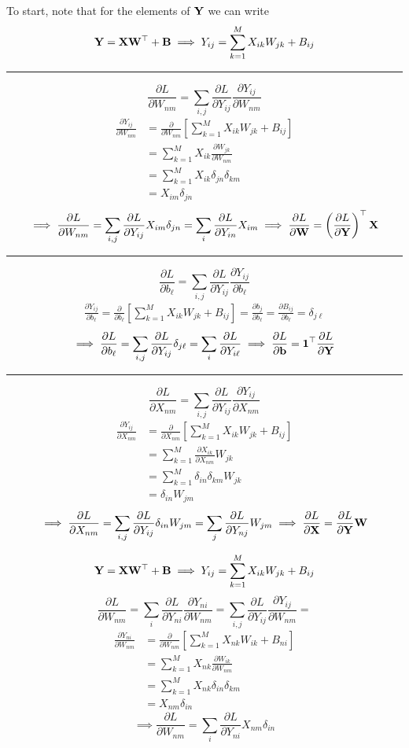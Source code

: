 \documentclass[a4paper]{article}
\newcommand{\1}{\mathbbm{1}}
\renewcommand{\l}{\left}
\renewcommand{\r}{\right}
\newcommand{\<}{\langle}
\renewcommand{\>}{\rangle}
\newcommand{\p}[1]{\frac{\partial}{\partial #1}}
\newcommand{\pp}[2]{\frac{\partial #1}{\partial #2}}
\newcommand{\bs}{\boldsymbol}
\begin{document}
\begin{ans}[Solution]
To start, note that for the elements of $\bold Y$ we can write
$$\bold Y = \bold X \bold W^\top + \bold B \implies Y_{ij} = \sum_{k=1}^M X_{ik} W_{jk} + B_{ij}$$
\hrule
$$\pp{L}{W_{nm}} = \sum_{i,j} \pp{L}{Y_{ij}} \pp{Y_{ij}}{W_{nm}}$$
\begin{align*}
\pp{Y_{ij}}{W_{nm}} &= \p{W_{nm}} \l[ \sum_{k=1}^M X_{ik} W_{jk} + B_{ij} \r] \\
&= \sum_{k=1}^M X_{ik} \pp{W_{jk}}{W_{nm}} \\
&= \sum_{k=1}^M X_{ik} \delta_{jn} \delta_{km} \\
&= X_{im} \delta_{jn}
\end{align*}
$$\implies \pp{L}{W_{nm}} = \sum_{i,j} \pp{L}{Y_{ij}} X_{im} \delta_{jn} = \sum_i \pp{L}{Y_{in}} X_{im} \implies \pp{L}{\bold W} = \l( \pp{L}{\bold Y} \r)^\top \bold X$$
\hrule
$$\pp{L}{b_\ell} = \sum_{i,j} \pp{L}{Y_{ij}} \pp{Y_{ij}}{b_\ell}$$
\begin{align*}
\pp{Y_{ij}}{b_\ell} = \p{b_\ell} \l[ \sum_{k=1}^M X_{ik} W_{jk} + B_{ij} \r] = \pp{b_j}{b_\ell} = \pp{B_{ij}}{b_\ell} = \delta_{j\ell}
\end{align*}
$$\implies \pp{L}{b_\ell} = \sum_{i,j} \pp{L}{Y_{ij}} \delta_{j\ell} = \sum_i \pp{L}{Y_{i\ell}} \implies \pp{L}{\bold b} = \bs1^\top \pp{L}{\bold Y}$$
\hrule
$$\pp{L}{X_{nm}} = \sum_{i,j} \pp{L}{Y_{ij}} \pp{Y_{ij}}{X_{nm}}$$
\begin{align*}
\pp{Y_{ij}}{X_{nm}} &= \p{X_{nm}} \l[ \sum_{k=1}^M X_{ik} W_{jk} + B_{ij} \r] \\
&= \sum_{k=1}^M \pp{X_{ik}}{X_{nm}} W_{jk} \\
&= \sum_{k=1}^M \delta_{in} \delta_{km} W_{jk} \\
&= \delta_{in} W_{jm}
\end{align*}
$$\implies \pp{L}{X_{nm}} = \sum_{i,j} \pp{L}{Y_{ij}} \delta_{in} W_{jm} = \sum_j \pp{L}{Y_{nj}} W_{jm} \implies \pp{L}{\bold X} = \pp{L}{\bold Y} \bold W$$
\end{ans}
\newpage
\begin{ans}
$$\bold Y = \bold X \bold W^\top + \bold B \implies Y_{ij} = \sum_{k=1}^M X_{ik} W_{jk} + B_{ij}$$
$$\pp{L}{W_{nm}} = \sum_i \pp{L}{Y_{ni}} \pp{Y_{ni}}{W_{nm}} = \sum_{i,j} \pp{L}{Y_{ij}} \pp{Y_{ij}}{W_{nm}} = $$
\begin{align*}
\pp{Y_{ni}}{W_{nm}} &= \p{W_{nm}} \l[ \sum_{k=1}^M X_{nk} W_{ik} + B_{ni} \r] \\
&= \sum_{k=1}^M X_{nk} \pp{W_{ik}}{W_{nm}} \\
&= \sum_{k=1}^M X_{nk} \delta_{in} \delta_{km} \\
&= X_{nm} \delta_{in}
\end{align*}
$$\implies \pp{L}{W_{nm}} = \sum_i \pp{L}{Y_{ni}} X_{nm} \delta_{in}$$
\end{ans}
\end{document}
